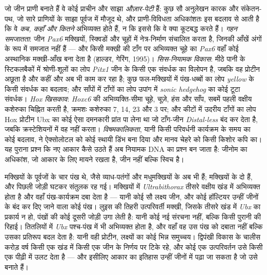 \begin{definition}[विकास-परिवर्धन]\label{def:b3:developmental-genetics:evodevo}
जो जीन प्राणी बनाते हैं वे कोई प्राचीन और साझा \emph{औज़ार-पेटी} हैं:
कुछ सौ अनुलेखन कारक और संकेतन-पथ, जो सारे प्राणियों के साझा पूर्वज में
मौजूद थे, और प्राणी-विविधता अधिकांशतः इस बदलाव से आती है कि वे
\emph{कब, कहाँ और कितने} अभिव्यक्त होते हैं, न कि इससे कि वे क्या
कूटबद्ध करते हैं। \emph{गहन समजातता}: जीन \emph{Pax6} मक्खियों,
स्क्विडों और चूहों में नेत्र-निर्माण संचालित करता है, जिनकी आँखें अंगों
के रूप में समजात नहीं हैं --- और किसी मक्खी की टाँग पर अभिव्यक्त चूहे का
\emph{Pax6} वहाँ कोई अस्थानिक मक्खी-आँख बना देता है (हाल्डर, गेरिंग,
1995)। \emph{सिस-नियामक विकास}: मीठे पानी के स्टिकलबैकों में श्रोणी-शूलों
का लोप \emph{Pitx1} जीन के किसी एक संवर्धक का विलोपन है, जबकि वह
प्रोटीन अछूता है और कहीं और अब भी काम कर रहा है; कुछ फल-मक्खियों में
पंख-धब्बों का लोप \emph{yellow} के किसी संवर्धक का बदलाव; और साँपों में
टाँगों का लोप उपांग में \emph{sonic hedgehog} का कोई टूटा संवर्धक।
\emph{Hox खिसकाव}: \emph{Hoxc6} की अभिव्यक्ति-सीमा चूहे, चूज़े, हंस और
साँप, सबमें पहली वक्षीय कशेरुका चिह्नित करती है, क्रमशः कशेरुका 7, 14,
23 और 3 पर; और कीटों में उदरीय टाँगों का लोप Hox प्रोटीन Ubx का कोई ऐसा
दमनकारी प्रांत पा लेना था जो टाँग-जीन \emph{Distal-less} बंद कर देता
है, जबकि क्रस्टेशियनों में वह नहीं करता। \emph{विषमकालिकता}, यानी किसी
परिवर्धनी कार्यक्रम के समय का कोई बदलाव, ने ऐक्सोलोटल को कोई स्थायी
डिंभ बना दिया और मानव चेहरे को किसी किशोर कपि का। यह पुराना प्रश्न कि
नए आकार कैसे उठते हैं अब नियामक DNA का प्रश्न बन जाता है: जीनोम का
अधिकांश, जो आकार के लिए मायने रखता है, जीन नहीं बल्कि स्विच है।
\end{definition}

\begin{example}[चार पंख]\label{ex:b3:developmental-genetics:four-wings}
मक्खियों के पूर्वजों के चार पंख थे, जैसे व्याध-पतंगों और मधुमक्खियों के
अब भी हैं; मक्खियों के दो हैं, और पिछली जोड़ी घटकर संतुलक रह गई।
मक्खियों में \emph{Ultrabithorax} तीसरे वक्षीय खंड में अभिव्यक्त होता है
और वहाँ पंख-कार्यक्रम दबा देता है --- यानी कोई सौ लक्ष्य जीन, और कोई
हॉल्टियर उन्हीं जीनों के बंद कर दिए जाने वाला कोई पंख। लुइस की तिहरी
उत्परिवर्ती मक्खी, जिसके तीसरे खंड में \emph{Ubx} का प्रकार्य न हो,
पंखों की कोई दूसरी जोड़ी उगा लेती है: यानी कोई नई संरचना नहीं, बल्कि
किसी पुरानी की रिहाई। तितलियों में \emph{Ubx} पश्च-पंख में भी अभिव्यक्त
होता है, और वहाँ वह उस पंख को दबाता नहीं बल्कि उसका प्रतिरूप बदल देता
है: यानी वही प्रोटीन, लक्ष्यों का कोई भिन्न समुच्चय। द्विपंखी विकास के
चालीस करोड़ वर्ष किसी एक खंड में किसी एक जीन के निर्णय पर टिके रहे, और
कोई एक उत्परिवर्तन उसे किसी एक पीढ़ी में उलट देता है --- और इसीलिए आकार
का इतिहास उन्हीं जीनों में पढ़ा जा सकता है जो उसे बनाते हैं।
\end{example}

